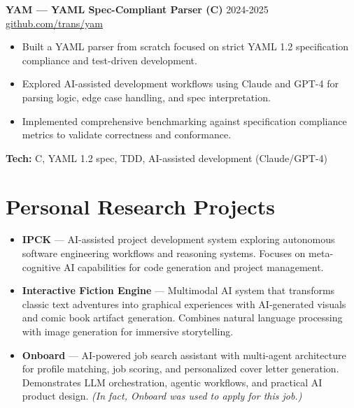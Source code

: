 \documentclass[11pt]{article}
\begin{document}
\vspace{6pt}
\textbf{YAM --- YAML Spec-Compliant Parser (C)} \hfill 2024-2025\\
\href{https://github.com/trans/yam}{github.com/trans/yam}
\vspace{2pt}
\begin{itemize}
  \item Built a YAML parser from scratch focused on strict YAML 1.2 specification compliance and test-driven development.
  \item Explored AI-assisted development workflows using Claude and GPT-4 for parsing logic, edge case handling, and spec interpretation.
  \item Implemented comprehensive benchmarking against specification compliance metrics to validate correctness and conformance.
\end{itemize}
\vspace{6pt}
\textbf{Tech:} C, YAML 1.2 spec, TDD, AI-assisted development (Claude/GPT-4)

\section*{Personal Research Projects}

\begin{itemize}[leftmargin=*,labelsep=5.85mm]

\item \textbf{IPCK} — AI-assisted project development system exploring autonomous software engineering workflows and reasoning systems. Focuses on meta-cognitive AI capabilities for code generation and project management.

\item \textbf{Interactive Fiction Engine} — Multimodal AI system that transforms classic text adventures into graphical experiences with AI-generated visuals and comic book artifact generation. Combines natural language processing with image generation for immersive storytelling.

\item \textbf{Onboard} — AI-powered job search assistant with multi-agent architecture for profile matching, job scoring, and personalized cover letter generation. Demonstrates LLM orchestration, agentic workflows, and practical AI product design. \textit{(In fact, Onboard was used to apply for this job.)}

\end{itemize}
\end{document}
